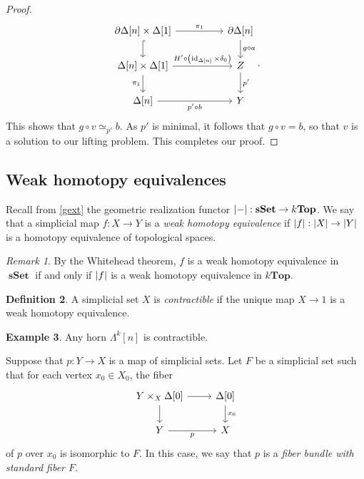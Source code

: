 \documentclass[10pt,letterpaper,cm]{nupset}
\theoremstyle{definition}
\newtheorem{definition}{Definition}[subsection]
\newtheorem{exmp}[definition]{Example}
\theoremstyle{theorem}
\theoremstyle{remark}
\newtheorem{remark}[definition]{Remark}
\newcommand{\0}{\mathbf{0}}
\newcommand{\1}{\mathbf{1}}
\newcommand{\2}{\mathbf{2}}
\DeclareMathOperator{\sset}{\mathbf{sSet}}
\DeclareMathOperator{\idd}{id}
\begin{document}
\begin{proof}
\[\begin{tikzcd}[column sep=huge]
{\partial{\Delta[n]}\times \Delta[1]} \arrow[d, hook] \arrow[r, "\pi_1"]                                             & {\partial{\Delta[n]}} \arrow[d, "g\circ a"] \\
{\Delta[n]\times \Delta[1]} \arrow[d, "\pi_1"'] \arrow[r, "{H'\circ \mleft(\idd_{\Delta[n]} \times \delta_0\mright)}"] & Z \arrow[d, "p'"]                           \\
{\Delta[n]} \arrow[r, "p'\circ b"']                                                                                  & Y                                          
\end{tikzcd}.
\] This shows that $g\circ v \simeq_{p'} b$. As $p'$ is minimal, it follows that  $g\circ v = b$, so that $v$ is a solution to our lifting problem. This completes our proof.
\end{proof}

\subsection*{Weak homotopy equivalences}

Recall from \cref{gext} the geometric realization functor $\mleft\lvert{-}\mright\rvert : \sset \to  k\mathbf{Top}$. We say that a simplicial map $f: X \to Y$ is a \textit{weak homotopy equivalence} if $\mleft\lvert{f}\mright\rvert : \mleft\lvert{X}\mright\rvert \to \mleft\lvert{Y}\mright\rvert$ is a homotopy equivalence of topological spaces. 

\begin{remark}
By the Whitehead theorem, $f$ is a weak homotopy equivalence in $\sset$ if and only if $\mleft\lvert{f}\mright\rvert$ is a weak homotopy equivalence in  $k\mathbf{Top}$.
\end{remark}

\begin{definition}
A simplicial set $X$ is \textit{contractible} if the unique map $X \to 1$ is a weak homotopy equivalence.
\end{definition}

\begin{exmp}
Any horn $\Lambda^k[n]$ is contractible.
\end{exmp}

\smallskip

Suppose that $p: Y \to X$ is a map of simplicial sets. Let $F$ be a simplicial set such that for each vertex $x_0 \in X_0$,  the fiber 
\[
\begin{tikzcd}
{Y\times_X \Delta[0]} \arrow[d] \arrow[r] & {\Delta[0]} \arrow[d, "x_0"] \\
Y \arrow[r, "p"']                         & X                           
\end{tikzcd}
\] of $p$ over $x_0$ is isomorphic to $F$. In this case, we say that $p$ is a \textit{fiber bundle with standard fiber $F$}. 
\end{document}
